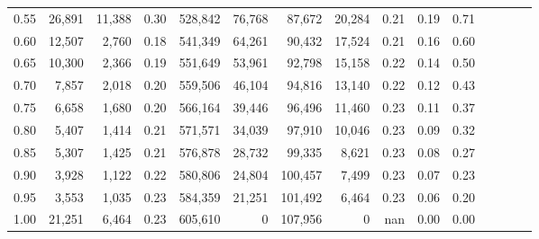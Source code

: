 \begin{tabular}{rrrcrrrrrrrrrrr}
0.55 &   26,891 &  11,388 &                                       0.30 &  528,842 &   76,768 &   87,672 &   20,284 &  0.21 &  0.19 &                         0.71 \\
0.60 &   12,507 &   2,760 &                                       0.18 &  541,349 &   64,261 &   90,432 &   17,524 &  0.21 &  0.16 &                         0.60 \\
0.65 &   10,300 &   2,366 &                                       0.19 &  551,649 &   53,961 &   92,798 &   15,158 &  0.22 &  0.14 &                         0.50 \\
0.70 &    7,857 &   2,018 &                                       0.20 &  559,506 &   46,104 &   94,816 &   13,140 &  0.22 &  0.12 &                         0.43 \\
0.75 &    6,658 &   1,680 &                                       0.20 &  566,164 &   39,446 &   96,496 &   11,460 &  0.23 &  0.11 &                         0.37 \\
0.80 &    5,407 &   1,414 &                                       0.21 &  571,571 &   34,039 &   97,910 &   10,046 &  0.23 &  0.09 &                         0.32 \\
0.85 &    5,307 &   1,425 &                                       0.21 &  576,878 &   28,732 &   99,335 &    8,621 &  0.23 &  0.08 &                         0.27 \\
0.90 &    3,928 &   1,122 &                                       0.22 &  580,806 &   24,804 &  100,457 &    7,499 &  0.23 &  0.07 &                         0.23 \\
0.95 &    3,553 &   1,035 &                                       0.23 &  584,359 &   21,251 &  101,492 &    6,464 &  0.23 &  0.06 &                         0.20 \\
1.00 &   21,251 &   6,464 &                                       0.23 &  605,610 &        0 &  107,956 &        0 &   nan &  0.00 &                         0.00 \\
\bottomrule
\end{tabular}
